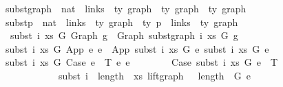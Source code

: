 \begin{isabellebody}
\ subst{\isacharunderscore}{\kern0pt}graph\ {\isacharcolon}{\kern0pt}{\isacharcolon}{\kern0pt}\ {\isachardoublequoteopen}nat\ {\isacharequal}{\kern0pt}{\isachargreater}{\kern0pt}\ links\ {\isacharequal}{\kern0pt}{\isachargreater}{\kern0pt}\ {\isacharprime}{\kern0pt}ty\ graph\ {\isacharequal}{\kern0pt}{\isachargreater}{\kern0pt}\ {\isacharprime}{\kern0pt}ty\ graph\ {\isacharequal}{\kern0pt}{\isachargreater}{\kern0pt}\ {\isacharprime}{\kern0pt}ty\ graph{\isachardoublequoteclose}\isanewline
{}\ subst{\isacharunderscore}{\kern0pt}p\ {\isacharcolon}{\kern0pt}{\isacharcolon}{\kern0pt}\ {\isachardoublequoteopen}nat\ {\isacharequal}{\kern0pt}{\isachargreater}{\kern0pt}\ links\ {\isacharequal}{\kern0pt}{\isachargreater}{\kern0pt}\ {\isacharprime}{\kern0pt}ty\ graph\ {\isacharequal}{\kern0pt}{\isachargreater}{\kern0pt}\ {\isacharprime}{\kern0pt}ty\ p\ {\isacharequal}{\kern0pt}{\isachargreater}{\kern0pt}\ links\ {\isacharequal}{\kern0pt}{\isachargreater}{\kern0pt}\ {\isacharprime}{\kern0pt}ty\ graph{\isachardoublequoteclose}\isanewline
{}\isanewline
\ \ \isanewline
\ \ {\isachardoublequoteopen}subst\ i\ xs\ G\ {\isacharparenleft}{\kern0pt}Graph\ g{\isacharparenright}{\kern0pt}\ {\isacharequal}{\kern0pt}\ Graph\ {\isacharparenleft}{\kern0pt}subst{\isacharunderscore}{\kern0pt}graph\ i\ xs\ G\ g{\isacharparenright}{\kern0pt}{\isachardoublequoteclose}\isanewline
{\isacharbar}{\kern0pt}\ {\isachardoublequoteopen}subst\ i\ xs\ G\ {\isacharparenleft}{\kern0pt}App\ e{}\ e{}{\isacharparenright}{\kern0pt}\ {\isacharequal}{\kern0pt}\ App\ {\isacharparenleft}{\kern0pt}subst\ i\ xs\ G\ e{}{\isacharparenright}{\kern0pt}\ {\isacharparenleft}{\kern0pt}subst\ i\ xs\ G\ e{}{\isacharparenright}{\kern0pt}{\isachardoublequoteclose}\isanewline
{\isacharbar}{\kern0pt}\ {\isachardoublequoteopen}subst\ i\ xs\ G\ {\isacharparenleft}{\kern0pt}Case\ e{}\ {\isasymGamma}\ T\ e{}\ e{}{\isacharparenright}{\kern0pt}\ {\isacharequal}{\kern0pt}\isanewline
\ \ \ \ \ \ \ Case\ {\isacharparenleft}{\kern0pt}subst\ i\ xs\ G\ e{}{\isacharparenright}{\kern0pt}\ {\isasymGamma}\ T\isanewline
\ \ \ \ \ \ \ \ \ \ \ \ {\isacharparenleft}{\kern0pt}subst\ {\isacharparenleft}{\kern0pt}i\ {\isacharplus}{\kern0pt}\ length\ {\isasymGamma}{\isacharparenright}{\kern0pt}\ xs\ {\isacharparenleft}{\kern0pt}{\isacharparenleft}{\kern0pt}lift{\isacharunderscore}{\kern0pt}graph\ {}\ {\isacharcircum}{\kern0pt}{\isacharcircum}{\kern0pt}\ {\isacharparenleft}{\kern0pt}length\ {\isasymGamma}{\isacharparenright}{\kern0pt}{\isacharparenright}{\kern0pt}\ G{\isacharparenright}{\kern0pt}\ e{}{\isacharparenright}{\kern0pt}\isanewline

\end{isabellebody}
